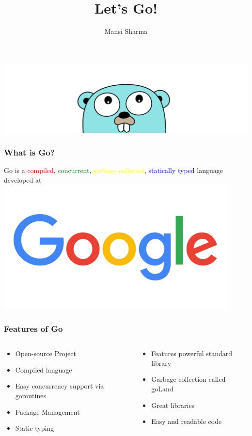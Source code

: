 \documentclass[14pt]{beamer}
\title[A Tour of Go]{\huge Let's Go!}
\author{Mansi Sharma}
\begin{document}
{
\begin{frame}
    \titlepage
    \includegraphics[width=\linewidth]{img/golang.png}
\end{frame}
}

{
\begin{frame}
    \frametitle {What is Go?}
    \begin{center}
        \textcolor{deepblue}{Go is a \textcolor{red}{compiled}, \textcolor{green}{concurrent}, \textcolor{yellow}{garbage-collected}, \textcolor{blue}{statically typed} language developed at}
        \linebreak
        \includegraphics[width=0.3\linewidth]{img/google.png}
    \end{center}
\end{frame}
}

{
\begin{frame}
    \frametitle{Features of Go}
    \begin{columns}
        \begin{column}{0.5\textwidth}
            \begin{itemize}
                \item Open-source Project
                \item Compiled language
                \item Easy concurrency support via goroutines
                \item Package Management
                \item Static typing
            \end{itemize}
        \end{column}
        \begin{column}{0.5\textwidth}
            \begin{itemize}
                \item Features powerful standard library
                \item Garbage collection called goLand
                \item Great libraries
                \item Easy and readable code
            \end{itemize}
        \end{column}
    \end{columns}
\end{frame}
}
\end{document}
